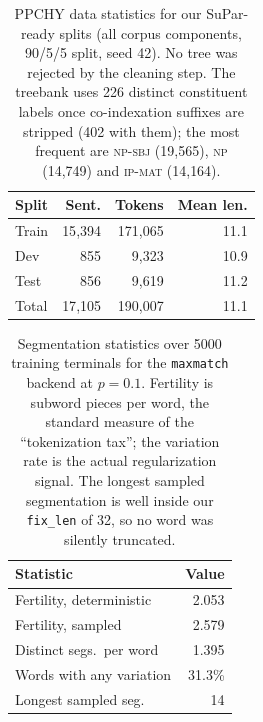 \documentclass[11pt]{article}
\begin{document}
\begin{table}[H]
\centering
\small
\setlength{\tabcolsep}{4pt}
\begin{tabular}{@{}lrrr@{}}
\toprule
\textbf{Split} & \textbf{Sent.} & \textbf{Tokens} & \textbf{Mean len.} \\
\midrule
Train & 15{,}394 & 171{,}065 & 11.1 \\
Dev   &     855  &   9{,}323 & 10.9 \\
Test  &     856  &   9{,}619 & 11.2 \\
\midrule
Total & 17{,}105 & 190{,}007 & 11.1 \\
\bottomrule
\end{tabular}
\caption{PPCHY data statistics for our SuPar-ready splits (all corpus
components, 90/5/5 split, seed 42). No tree was rejected by the cleaning step.
The treebank uses 226 distinct constituent labels once co-indexation suffixes are
stripped (402 with them); the most frequent are \textsc{np-sbj} (19{,}565),
\textsc{np} (14{,}749) and \textsc{ip-mat} (14{,}164).}
\label{tab:data}
\end{table}

\begin{table}[H]
\centering
\small
\setlength{\tabcolsep}{4pt}
\begin{tabular}{@{}lr@{}}
\toprule
\textbf{Statistic} & \textbf{Value} \\
\midrule
Fertility, deterministic  & 2.053 \\
Fertility, sampled        & 2.579 \\
Distinct segs.\ per word  & 1.395 \\
Words with any variation  & 31.3\% \\
Longest sampled seg.      & 14 \\
\bottomrule
\end{tabular}
\caption{Segmentation statistics over 5000 training terminals for the
\texttt{maxmatch} backend at $p{=}0.1$. Fertility is subword pieces per word, the
standard measure of the ``tokenization tax''; the variation rate is the actual
regularization signal. The longest sampled segmentation is well inside our
\texttt{fix\_len} of 32, so no word was silently truncated.}
\label{tab:fertility}
\end{table}
\end{document}
